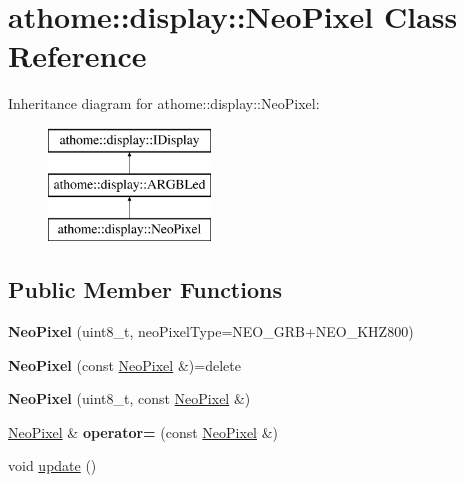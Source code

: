 \hypertarget{classathome_1_1display_1_1_neo_pixel}{}\section{athome\+:\+:display\+:\+:Neo\+Pixel Class Reference}
\label{classathome_1_1display_1_1_neo_pixel}
Inheritance diagram for athome\+:\+:display\+:\+:Neo\+Pixel\+:\begin{figure}[H]
\begin{center}
\leavevmode
\includegraphics[height=3.000000cm]{classathome_1_1display_1_1_neo_pixel}
\end{center}
\end{figure}
\subsection*{Public Member Functions}
\begin{DoxyCompactItemize}
\item 
\mbox{\label{classathome_1_1display_1_1_neo_pixel_a64046ecfed0d4b9471d789666eaf4ac7}} 
{\bfseries Neo\+Pixel} (uint8\+\_\+t, neo\+Pixel\+Type=N\+E\+O\+\_\+\+G\+RB+N\+E\+O\+\_\+\+K\+H\+Z800)
\item 
\mbox{\label{classathome_1_1display_1_1_neo_pixel_ad5a1f009a721fcecde3b2990a139f83b}} 
{\bfseries Neo\+Pixel} (const \mbox{\hyperlink{classathome_1_1display_1_1_neo_pixel}{Neo\+Pixel}} \&)=delete
\item 
\mbox{\label{classathome_1_1display_1_1_neo_pixel_a6a99bf128ee577e043e673835539358e}} 
{\bfseries Neo\+Pixel} (uint8\+\_\+t, const \mbox{\hyperlink{classathome_1_1display_1_1_neo_pixel}{Neo\+Pixel}} \&)
\item 
\mbox{\label{classathome_1_1display_1_1_neo_pixel_a6ed0c3b96ab942d8b272a99c59185995}} 
\mbox{\hyperlink{classathome_1_1display_1_1_neo_pixel}{Neo\+Pixel}} \& {\bfseries operator=} (const \mbox{\hyperlink{classathome_1_1display_1_1_neo_pixel}{Neo\+Pixel}} \&)
\item 
void \mbox{\hyperlink{classathome_1_1display_1_1_neo_pixel_a272bca4da78dff7dc02bcd023665e013}{update}} ()
\end{DoxyCompactItemize}


